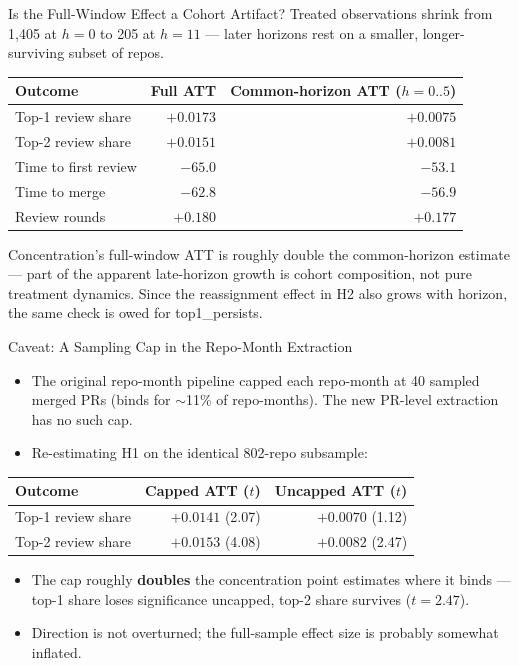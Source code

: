 \begin{frame}{Is the Full-Window Effect a Cohort Artifact?}
Treated observations shrink from 1,405 at $h{=}0$ to 205 at $h{=}11$ ---
later horizons rest on a smaller, longer-surviving subset of repos.
\begin{table}
\centering
\scriptsize
\begin{tabular}{lrr}
\toprule
Outcome & Full ATT & Common-horizon ATT ($h=0..5$) \\
\midrule
Top-1 review share     & $+0.0173$ & $+0.0075$ \\
Top-2 review share     & $+0.0151$ & $+0.0081$ \\
Time to first review   & $-65.0$   & $-53.1$ \\
Time to merge          & $-62.8$   & $-56.9$ \\
Review rounds          & $+0.180$  & $+0.177$ \\
\bottomrule
\end{tabular}
\end{table}
Concentration's full-window ATT is roughly double the common-horizon
estimate --- part of the apparent late-horizon growth is cohort
composition, not pure treatment dynamics. Since the reassignment effect
in H2 also grows with horizon, the same check is owed for
top1\_persists.
\end{frame}

\begin{frame}{Caveat: A Sampling Cap in the Repo-Month Extraction}
\begin{itemize}
  \item The original repo-month pipeline capped each repo-month at 40
        sampled merged PRs (binds for $\sim$11\% of repo-months). The
        new PR-level extraction has no such cap.
  \item Re-estimating H1 on the identical 802-repo subsample:
\end{itemize}
\begin{table}
\centering
\small
\begin{tabular}{lrr}
\toprule
Outcome & Capped ATT ($t$) & Uncapped ATT ($t$) \\
\midrule
Top-1 review share & $+0.0141$ (2.07) & $+0.0070$ (1.12) \\
Top-2 review share & $+0.0153$ (4.08) & $+0.0082$ (2.47) \\
\bottomrule
\end{tabular}
\end{table}
\begin{itemize}
  \item The cap roughly \textbf{doubles} the concentration point
        estimates where it binds --- top-1 share loses significance
        uncapped, top-2 share survives ($t=2.47$).
  \item Direction is not overturned; the full-sample effect size is
        probably somewhat inflated.
\end{itemize}
\end{frame}

